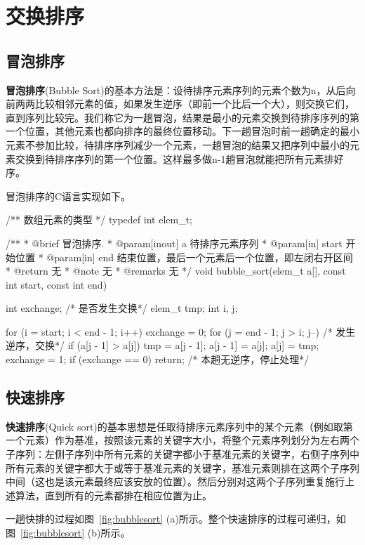 \section{交换排序} %


\subsection{冒泡排序}
\textbf{冒泡排序}(Bubble Sort)的基本方法是：设待排序元素序列的元素个数为n，从后向前两两比较相邻元素的值，如果发生逆序（即前一个比后一个大），则交换它们，直到序列比较完。我们称它为一趟冒泡，结果是最小的元素交换到待排序序列的第一个位置，其他元素也都向排序的最终位置移动。下一趟冒泡时前一趟确定的最小元素不参加比较，待排序序列减少一个元素，一趟冒泡的结果又把序列中最小的元素交换到待排序序列的第一个位置。这样最多做n-1趟冒泡就能把所有元素排好序。

冒泡排序的C语言实现如下。
\begin{Codex}[label=bubble_sort.c]
/** 数组元素的类型 */
typedef int elem_t;

/**
  * @brief 冒泡排序.
  * @param[inout] a 待排序元素序列
  * @param[in] start 开始位置
  * @param[in] end 结束位置，最后一个元素后一个位置，即左闭右开区间
  * @return 无
  * @note 无
  * @remarks 无
  */
void bubble_sort(elem_t a[], const int start, const int end) {
    int exchange; /* 是否发生交换*/
    elem_t tmp;
    int i, j;

    for (i = start; i < end - 1; i++) {
        exchange = 0;
        for (j = end - 1; j > i; j--) { /* 发生逆序，交换*/
            if (a[j - 1] > a[j]) {
                tmp = a[j - 1];
                a[j - 1] = a[j];
                a[j] = tmp;
                exchange = 1;
            }
        }
        if (exchange == 0) return; /* 本趟无逆序，停止处理*/
    }
}
\end{Codex}

\subsection{快速排序}
\textbf{快速排序}(Quick sort)的基本思想是任取待排序元素序列中的某个元素（例如取第一个元素）作为基准，按照该元素的关键字大小，将整个元素序列划分为左右两个子序列：左侧子序列中所有元素的关键字都小于基准元素的关键字，右侧子序列中所有元素的关键字都大于或等于基准元素的关键字，基准元素则排在这两个子序列中间（这也是该元素最终应该安放的位置）。然后分别对这两个子序列重复施行上述算法，直到所有的元素都排在相应位置为止。

一趟快排的过程如图~\ref{fig:bubblesort} (a)所示。整个快速排序的过程可递归，如图~\ref{fig:bubblesort} (b)所示。

